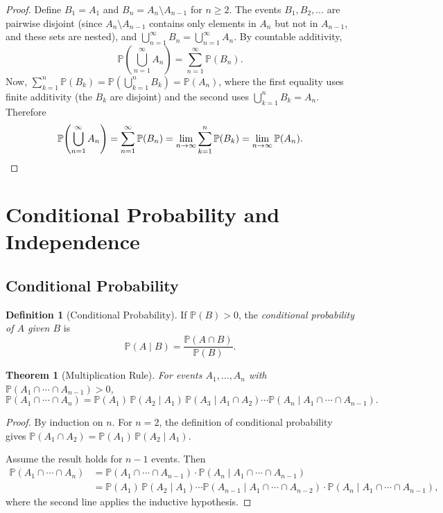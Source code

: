 \documentclass[11pt,a4paper]{article}
\theoremstyle{definition}
\newtheorem{definition}{Definition}[section]
\theoremstyle{plain}
\newtheorem{theorem}{Theorem}[section]
\theoremstyle{remark}
\newcommand{\Prob}{\mathbb{P}}
\begin{document}
\begin{proof}
Define $B_1 = A_1$ and $B_n = A_n \setminus A_{n-1}$ for $n \geq 2$. The events
$B_1, B_2, \ldots$ are pairwise disjoint (since $A_n \setminus A_{n-1}$ contains only
elements in $A_n$ but not in $A_{n-1}$, and these sets are nested), and
$\bigcup_{n=1}^\infty B_n = \bigcup_{n=1}^\infty A_n$. By countable additivity,
\[
    \Prob\!\left(\bigcup_{n=1}^\infty A_n\right) = \sum_{n=1}^\infty \Prob(B_n).
\]
Now, $\sum_{k=1}^n \Prob(B_k) = \Prob\!\left(\bigcup_{k=1}^n B_k\right) = \Prob(A_n)$,
where the first equality uses finite additivity (the $B_k$ are disjoint) and the second
uses $\bigcup_{k=1}^n B_k = A_n$. Therefore
\[
    \Prob\!\left(\bigcup_{n=1}^\infty A_n\right) = \sum_{n=1}^\infty \Prob(B_n)
    = \lim_{n \to \infty} \sum_{k=1}^n \Prob(B_k) = \lim_{n \to \infty} \Prob(A_n).
    \qedhere
\]
\end{proof}

\section{Conditional Probability and Independence}
\label{sec:cond_prob}

\subsection{Conditional Probability}

\begin{definition}[Conditional Probability]
\label{def:cond_prob}
If $\Prob(B) > 0$, the \emph{conditional probability of $A$ given $B$} is
\[
    \Prob(A \mid B) = \frac{\Prob(A \cap B)}{\Prob(B)}.
\]
\end{definition}

\begin{theorem}[Multiplication Rule]
\label{thm:mult_rule}
For events $A_1, \ldots, A_n$ with $\Prob(A_1 \cap \cdots \cap A_{n-1}) > 0$,
\[
    \Prob(A_1 \cap \cdots \cap A_n) = \Prob(A_1)\,\Prob(A_2 \mid A_1)\,
    \Prob(A_3 \mid A_1 \cap A_2) \cdots \Prob(A_n \mid A_1 \cap \cdots \cap A_{n-1}).
\]
\end{theorem}

\begin{proof}
By induction on $n$. For $n = 2$, the definition of conditional probability gives
$\Prob(A_1 \cap A_2) = \Prob(A_1)\,\Prob(A_2 \mid A_1)$.

Assume the result holds for $n - 1$ events. Then
\begin{align*}
    \Prob(A_1 \cap \cdots \cap A_n)
    &= \Prob(A_1 \cap \cdots \cap A_{n-1}) \cdot \Prob(A_n \mid A_1 \cap \cdots \cap A_{n-1}) \\
    &= \Prob(A_1)\,\Prob(A_2 \mid A_1) \cdots \Prob(A_{n-1} \mid A_1 \cap \cdots \cap A_{n-2})
       \cdot \Prob(A_n \mid A_1 \cap \cdots \cap A_{n-1}),
\end{align*}
where the second line applies the inductive hypothesis.
\end{proof}
\end{document}

